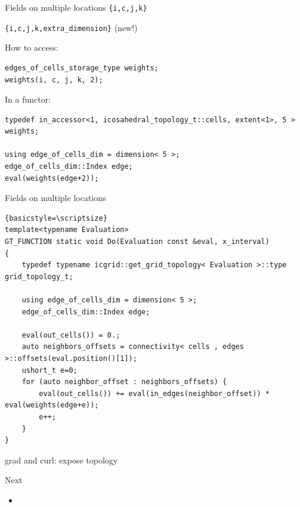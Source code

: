 \documentclass{beamer}
\begin{document}
\begin{frame}[fragile]{Fields on multiple locations}
\texttt{\{i,c,j,k\}}

\texttt{\{i,c,j,k,extra\_dimension\}} (new!)

How to access:
\begin{lstlisting}
edges_of_cells_storage_type weights;
weights(i, c, j, k, 2);
\end{lstlisting}

In a functor:
\begin{lstlisting}
typedef in_accessor<1, icosahedral_topology_t::cells, extent<1>, 5 > weights;

using edge_of_cells_dim = dimension< 5 >;
edge_of_cells_dim::Index edge;
eval(weights(edge+2));
\end{lstlisting}
\end{frame}

\begin{frame}[fragile]{Fields on multiple locations}
\begin{lstlisting}{basicstyle=\scriptsize}
template<typename Evaluation>
GT_FUNCTION static void Do(Evaluation const &eval, x_interval)
{
    typedef typename icgrid::get_grid_topology< Evaluation >::type grid_topology_t;

    using edge_of_cells_dim = dimension< 5 >;
    edge_of_cells_dim::Index edge;

    eval(out_cells()) = 0.;
    auto neighbors_offsets = connectivity< cells , edges >::offsets(eval.position()[1]);
    ushort_t e=0;
    for (auto neighbor_offset : neighbors_offsets) {
        eval(out_cells()) += eval(in_edges(neighbor_offset)) * eval(weights(edge+e));
        e++;
    }
}
\end{lstlisting}
\end{frame}

\begin{frame}
  grad and curl: expose topology
\end{frame}

\begin{frame}{Next}
  \begin{itemize}
    \item
  \end{itemize}
\end{frame}
\end{document}

